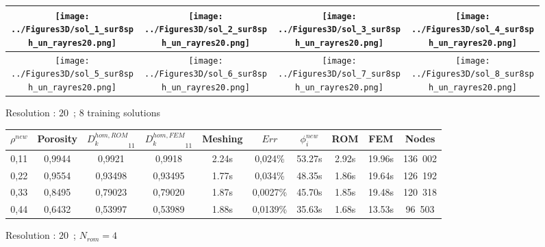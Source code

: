 {\begin{figure}[H]%
%
\begin{center}
\begin{tabular}{|c|c|c|c|}
\hline
\texttt{[image: ../Figures3D/sol\_1\_sur8sph\_un\_rayres20.png]}%
&%
\texttt{[image: ../Figures3D/sol\_2\_sur8sph\_un\_rayres20.png]}%
&%
\texttt{[image: ../Figures3D/sol\_3\_sur8sph\_un\_rayres20.png]}%
&%
\texttt{[image: ../Figures3D/sol\_4\_sur8sph\_un\_rayres20.png]}%
\\
\hline
\texttt{[image: ../Figures3D/sol\_5\_sur8sph\_un\_rayres20.png]}%
&%
\texttt{[image: ../Figures3D/sol\_6\_sur8sph\_un\_rayres20.png]}%
&%
\texttt{[image: ../Figures3D/sol\_7\_sur8sph\_un\_rayres20.png]}%
&%
\texttt{[image: ../Figures3D/sol\_8\_sur8sph\_un\_rayres20.png]}%
\\
\hline
\end{tabular}
\end{center}
\caption{Resolution : $20$\ ; $8$ training solutions}
%
\end{figure}

\begin{figure}[H]%
%
\begin{center}
\begin{tabular}{|c|c||c|c||c|c||c|c||c||c|}
\hline
\rowcolor{lightgray} $\rho^{new}$&Porosity&${D_k^{hom,ROM}}_{11}$&${D_k^{hom,FEM}}_{11}$&Meshing&$Err$&$\phi_i^{new}$&ROM&FEM&Nodes\\
\hline
0,11&0,9944&0,9921&0,9918&2.24s&0,024\%&53.27s&2.92s&19.96s&136\ 002\\
\hline
0,22&0,9554&0,93498&0,93495&1.77s&0,034\%&48.35s&1.86s&19.64s&126\ 192\\
\hline
0,33&0,8495&0,79023&0,79020&1.87s&0,0027\%&45.70s&1.85s&19.48s&120\ 318\\
\hline
0,44&0,6432&0,53997&0,53989&1.88s&0,0139\%&35.63s&1.68s&13.53s&96\ 503\\
\hline
\end{tabular}
\end{center}
\caption{Resolution : $20$\ ; $N_{rom}=4$}
%
\end{figure}

}
